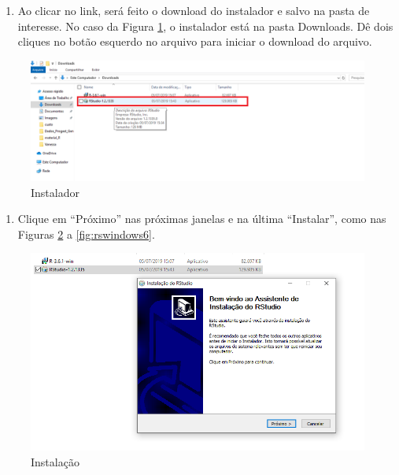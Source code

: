 \documentclass[
]{book}
\providecommand{\tightlist}{%
  \setlength{\itemsep}{0pt}\setlength{\parskip}{0pt}}
\begin{document}
\begin{enumerate}
\def\labelenumi{\arabic{enumi})}
\setcounter{enumi}{2}
\tightlist
\item
  Ao clicar no link, será feito o download do instalador e salvo na pasta de interesse. No caso da Figura \ref{fig:rswindows3}, o instalador está na pasta Downloads. Dê dois cliques no botão esquerdo no arquivo para iniciar o download do arquivo.
\end{enumerate}

\begin{figure}
\includegraphics[width=1\linewidth]{figures/install_Rstudio3} \caption{\label{fig:rswindows3} Instalador}\label{fig:rswindows3}
\end{figure}

\begin{enumerate}
\def\labelenumi{\arabic{enumi})}
\setcounter{enumi}{3}
\tightlist
\item
  Clique em ``Próximo'' nas próximas janelas e na última ``Instalar'', como nas Figuras \ref{fig:rswindows4} a \ref{fig:rswindows6}.
\end{enumerate}

\begin{figure}
\includegraphics[width=1\linewidth]{figures/install_Rstudio4} \caption{\label{fig:rswindows4} Instalação}\label{fig:rswindows4}
\end{figure}
\end{document}
